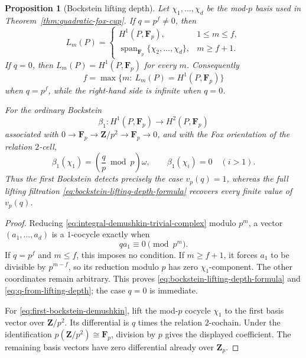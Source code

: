 \documentclass[11pt]{article}
\newtheorem{proposition}[theorem]{Proposition}
\theoremstyle{definition}
\newcommand{\Zp}{\mathbf Z_p}
\begin{document}
\begin{proposition}[Bockstein lifting depth]\label{prop:bockstein-lifting-depth}
Let $\chi_1,\ldots,\chi_d$ be the mod-$p$ basis used in Theorem~\ref{thm:quadratic-fox-cup}.
If $q=p^f\ne0$, then
\begin{equation}\label{eq:bockstein-lifting-depth-formula}
L_m(P)
=
\begin{cases}
H^1(P,\mathbf F_p),&1\le m\le f,\\[2pt]
\operatorname{span}_{\mathbf F_p}\{\chi_2,\ldots,\chi_d\},&m\ge f+1.
\end{cases}
\end{equation}
If $q=0$, then $L_m(P)=H^1(P,\mathbf F_p)$ for every $m$.  Consequently
\begin{equation}\label{eq:q-from-lifting-depth}
f
=
\max\{m:\ L_m(P)=H^1(P,\mathbf F_p)\}
\end{equation}
when $q=p^f$, while the right-hand side is infinite when $q=0$.

For the ordinary Bockstein
\[
\beta_1:H^1(P,\mathbf F_p)\longrightarrow H^2(P,\mathbf F_p)
\]
associated with $0\to\mathbf F_p\to\mathbf Z/p^2\to\mathbf F_p\to0$, and with the Fox orientation of the relation $2$-cell,
\begin{equation}\label{eq:first-bockstein-demushkin}
\beta_1(\chi_1)
=
\left(\frac{q}{p}\bmod p\right)\omega,
\qquad
\beta_1(\chi_i)=0\quad(i>1).
\end{equation}
Thus the first Bockstein detects precisely the case $v_p(q)=1$, whereas the full lifting filtration \eqref{eq:bockstein-lifting-depth-formula} recovers every finite value of $v_p(q)$.
\end{proposition}

\begin{proof}
Reducing \eqref{eq:integral-demushkin-trivial-complex} modulo $p^m$, a vector $(a_1,\ldots,a_d)$ is a $1$-cocycle exactly when
\[
q a_1\equiv0\pmod{p^m}.
\]
If $q=p^f$ and $m\le f$, this imposes no condition.  If $m\ge f+1$, it forces $a_1$ to be divisible by $p^{m-f}$, so its reduction modulo $p$ has zero $\chi_1$-component.  The other coordinates remain arbitrary.  This proves \eqref{eq:bockstein-lifting-depth-formula} and \eqref{eq:q-from-lifting-depth}; the case $q=0$ is immediate.

For \eqref{eq:first-bockstein-demushkin}, lift the mod-$p$ cocycle $\chi_1$ to the first basis vector over $\mathbf Z/p^2$.  Its differential is $q$ times the relation $2$-cochain.  Under the identification $p(\mathbf Z/p^2)\cong\mathbf F_p$, division by $p$ gives the displayed coefficient.  The remaining basis vectors have zero differential already over $\Zp$.
\end{proof}
\end{document}
